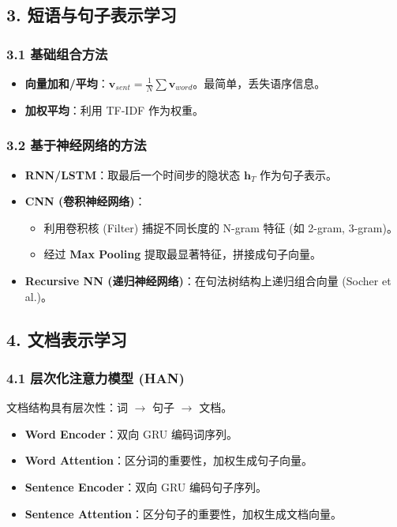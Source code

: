 \documentclass[a4paper, 11pt]{ctexart}
\begin{document}
\subsection{3. 短语与句子表示学习}

\subsubsection{3.1 基础组合方法}
\begin{itemize}
    \item \textbf{向量加和/平均}：$\mathbf{v}_{sent} = \frac{1}{N} \sum \mathbf{v}_{word}$。最简单，丢失语序信息。
    \item \textbf{加权平均}：利用 TF-IDF 作为权重。
\end{itemize}

\subsubsection{3.2 基于神经网络的方法}
\begin{itemize}
    \item \textbf{RNN/LSTM}：取最后一个时间步的隐状态 $\mathbf{h}_T$ 作为句子表示。
    \item \textbf{CNN (卷积神经网络)}：
    \begin{itemize}
        \item 利用卷积核 (Filter) 捕捉不同长度的 N-gram 特征 (如 2-gram, 3-gram)。
        \item 经过 \textbf{Max Pooling} 提取最显著特征，拼接成句子向量。
    \end{itemize}
    \item \textbf{Recursive NN (递归神经网络)}：在句法树结构上递归组合向量 (Socher et al.)。
\end{itemize}

\subsection{4. 文档表示学习}

\subsubsection{4.1 层次化注意力模型 (HAN)}
文档结构具有层次性：词 $\to$ 句子 $\to$ 文档。
\begin{itemize}
    \item \textbf{Word Encoder}：双向 GRU 编码词序列。
    \item \textbf{Word Attention}：区分词的重要性，加权生成句子向量。
    \item \textbf{Sentence Encoder}：双向 GRU 编码句子序列。
    \item \textbf{Sentence Attention}：区分句子的重要性，加权生成文档向量。
\end{itemize}
\end{document}

